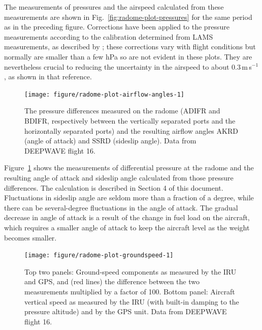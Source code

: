 \documentclass[12pt,twoside,english]{article}\usepackage[]{graphicx}\usepackage[]{color}
\newenvironment{knitrout}{}{} %
\let\OrgIndex\index
\renewcommand*{\index}[1]{\OrgIndex{#1}}
\begin{document}
The measurements of pressures and the airspeed calculated from these  measurements are shown in Fig.~\ref{fig:radome-plot-pressures} for the same period as in the preceding figure. Corrections have been applied to the pressure measurements according to the calibration determined from LAMS measurements, as described by \citet{CooperEtAl2014}; these corrections vary with flight conditions but normally are smaller than a few hPa so are not evident in these plots. They are nevertheless crucial to reducing the uncertainty in the airspeed to about 0.3\,m\,s$^{-1}$, as shown in that reference. 

\begin{knitrout}
\color{fgcolor}\begin{figure}
\texttt{[image: figure/radome-plot-airflow-angles-1]} \caption[Pressure differences measured on the radome (ADIFR and BDIFR)]{The pressure differences measured on the radome (ADIFR and BDIFR, respectively between the vertically separated ports and the horizontally separated ports) and the resulting airflow angles AKRD (angle of attack) and SSRD (sideslip angle). Data from DEEPWAVE flight 16.}\label{fig:radome-plot-airflow-angles}
\end{figure}


\end{knitrout}

Figure~\ref{fig:radome-plot-airflow-angles} shows the measurements of differential pressure at the radome and the resulting angle of attack and sideslip angle calculated from those pressure differences. The calculation is described in Section 4 of this document. Fluctuations in sideslip angle are seldom more than a fraction of a degree, while there can be several-degree fluctuations in the angle of attack. The gradual decrease in angle of attack is a result of the change in fuel load on the aircraft, which requires a smaller angle of attack to keep the aircraft level as the weight becomes smaller. 

\begin{knitrout}
\color{fgcolor}\begin{figure}
\texttt{[image: figure/radome-plot-groundspeed-1]} \caption[Ground-speed components measured by the IRU and GPS and vertical wind, DEEPWAVE flight 16.]{{Top two panels: Ground-speed components as measured by the IRU and GPS, and (red lines) the difference between the two measurements multiplied by a factor of 100. Bottom panel: Aircraft vertical speed as measured by the IRU (with built-in damping to the pressure altitude) and by the GPS unit. Data from DEEPWAVE flight 16.}}\label{fig:radome-plot-groundspeed}
\end{figure}


\end{knitrout}
\end{document}
